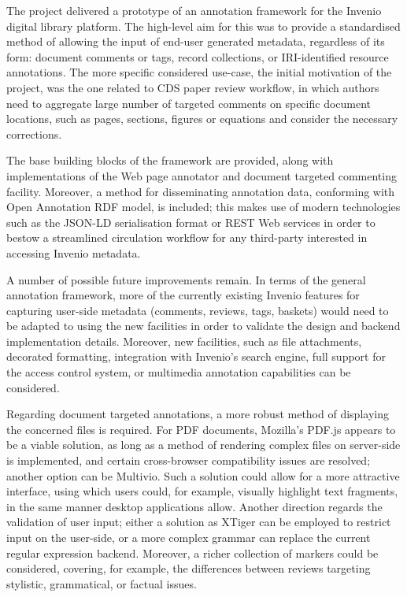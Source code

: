 
The project delivered a prototype of an annotation framework for the Invenio
digital library platform. The high-level aim for this was to provide a
standardised method of allowing the input of end-user generated metadata,
regardless of its form: document comments or tags, record collections, or
IRI-identified resource annotations. The more specific considered use-case, the
initial motivation of the project, was the one related to CDS paper review
workflow, in which authors need to aggregate large number of targeted comments
on specific document locations, such as pages, sections, figures or equations and
consider the necessary corrections.

The base building blocks of the framework are provided, along with
implementations of the Web page annotator and document targeted commenting
facility. Moreover, a method for disseminating annotation data, conforming with
Open Annotation RDF model, is included; this makes use of modern technologies
such as the JSON-LD serialisation format or REST Web services in order to
bestow a streamlined circulation workflow for any third-party interested in
accessing Invenio metadata.

A number of possible future improvements remain. In terms of the general
annotation framework, more of the currently existing Invenio features for
capturing user-side metadata (comments, reviews, tags, baskets) would need to
be adapted to using the new facilities in order to validate the design and
backend implementation details. Moreover, new facilities, such as file
attachments, decorated formatting, integration with Invenio's search engine,
full support for the access control system, or multimedia annotation
capabilities can be considered.

Regarding document targeted annotations, a more robust method of displaying the
concerned files is required. For PDF documents, Mozilla's PDF.js
appears to be a viable solution, as long as a method of rendering complex files
on server-side is implemented, and certain cross-browser compatibility issues
are resolved; another option can be Multivio. Such a solution could allow for
a more attractive interface, using which users could, for example, visually
highlight text fragments, in the same manner desktop applications allow.
Another direction regards the validation of user input; either a solution as
XTiger can be employed to restrict input on the user-side, or a more complex
grammar can replace the current regular expression backend. Moreover, a
richer collection of markers could be considered, covering, for example, the
differences between reviews targeting stylistic, grammatical, or factual issues.

